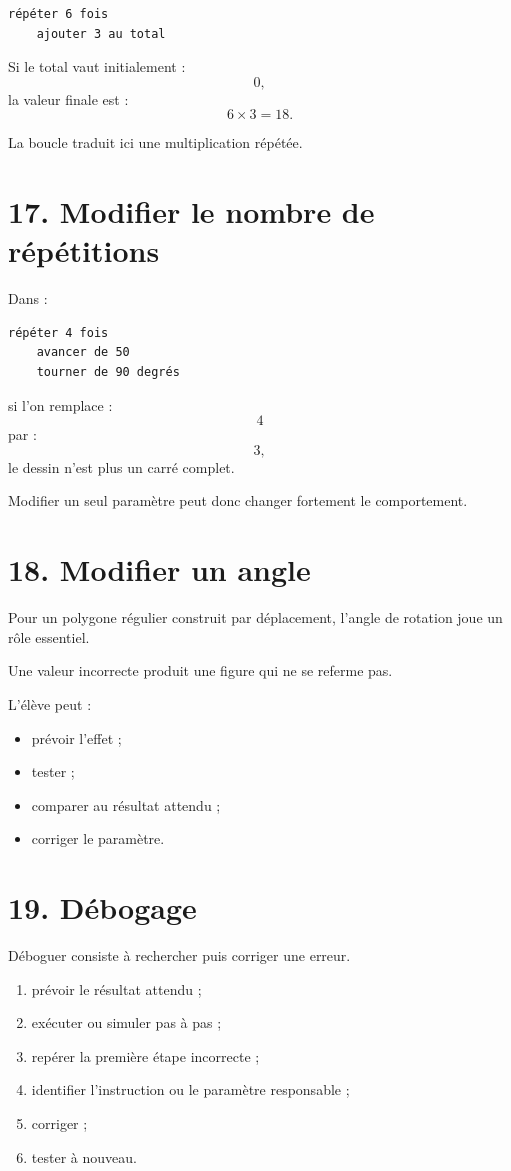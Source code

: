 \begin{verbatim}
répéter 6 fois
    ajouter 3 au total
\end{verbatim}

Si le total vaut initialement :
\[
0,
\]
la valeur finale est :
\[
6\times3=18.
\]

La boucle traduit ici une multiplication répétée.

\section{17. Modifier le nombre de répétitions}

Dans :
\begin{verbatim}
répéter 4 fois
    avancer de 50
    tourner de 90 degrés
\end{verbatim}

si l'on remplace :
\[
4
\]
par :
\[
3,
\]
le dessin n'est plus un carré complet.

Modifier un seul paramètre peut donc changer fortement le comportement.

\section{18. Modifier un angle}

Pour un polygone régulier construit par déplacement, l'angle de rotation joue un rôle essentiel.

Une valeur incorrecte produit une figure qui ne se referme pas.

L'élève peut :
\begin{itemize}
\item prévoir l'effet ;
\item tester ;
\item comparer au résultat attendu ;
\item corriger le paramètre.
\end{itemize}

\section{19. Débogage}

Déboguer consiste à rechercher puis corriger une erreur.

\begin{methode}
\begin{enumerate}
\item prévoir le résultat attendu ;
\item exécuter ou simuler pas à pas ;
\item repérer la première étape incorrecte ;
\item identifier l'instruction ou le paramètre responsable ;
\item corriger ;
\item tester à nouveau.
\end{enumerate}
\end{methode}

